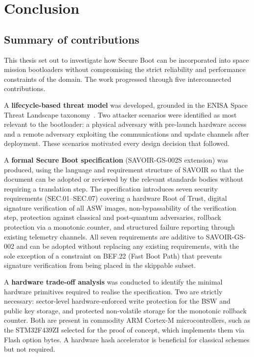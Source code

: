\chapter{Conclusion}
\label{chapter:conclusion}

\section{Summary of contributions}
\label{section:conclusion-summary}

This thesis set out to investigate how Secure Boot can be incorporated into space mission bootloaders without compromising the strict reliability and performance constraints of the domain. The work progressed through five interconnected contributions.

A \textbf{lifecycle-based threat model} was developed, grounded in the ENISA Space Threat Landscape taxonomy~\cite{enisa_2025}. Two attacker scenarios were identified as most relevant to the bootloader: a physical adversary with pre-launch hardware access and a remote adversary exploiting the communications and update channels after deployment. These scenarios motivated every design decision that followed.

A \textbf{formal Secure Boot specification} (SAVOIR-GS-002S extension) was produced, using the language and requirement structure of SAVOIR so that the document can be adopted or reviewed by the relevant standards bodies without requiring a translation step. The specification introduces seven security requirements (SEC.01--SEC.07) covering a hardware Root of Trust, digital signature verification of all ASW images, non-bypassability of the verification step, protection against classical and post-quantum adversaries, rollback protection via a monotonic counter, and structured failure reporting through existing telemetry channels. All seven requirements are additive to SAVOIR-GS-002 and can be adopted without replacing any existing requirements, with the sole exception of a constraint on BEF.22 (Fast Boot Path) that prevents signature verification from being placed in the skippable subset.

A \textbf{hardware trade-off analysis} was conducted to identify the minimal hardware primitives required to realise the specification. Two are strictly necessary: sector-level hardware-enforced write protection for the BSW and public key storage, and protected non-volatile storage for the monotonic rollback counter. Both are present in commodity ARM Cortex-M microcontrollers, such as the STM32F439ZI selected for the proof of concept, which implements them via Flash option bytes. A hardware hash accelerator is beneficial for classical schemes but not required.

